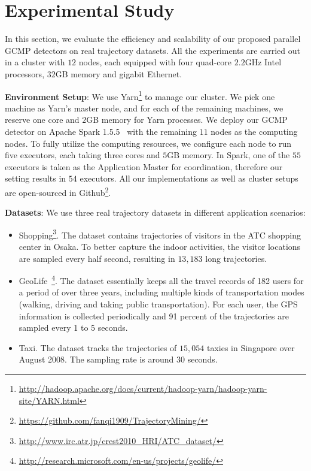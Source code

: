 \section{Experimental Study}
\label{sec:exp}
In this section, we evaluate the efficiency and scalability of our proposed parallel GCMP detectors on real trajectory datasets. All the experiments are carried out in a cluster with $12$ nodes, each equipped with four quad-core $2.2$GHz Intel processors, $32$GB memory and gigabit Ethernet. 

\textbf{Environment Setup}: We use Yarn\footnote{\url{http://hadoop.apache.org/docs/current/hadoop-yarn/hadoop-yarn-site/YARN.html}} to manage our cluster. We pick one machine as Yarn's master node, and for each of the remaining machines, we reserve one core and $2$GB memory for Yarn processes. We deploy our GCMP detector on Apache Spark 1.5.5~\cite{zaharia2012resilient} with the remaining $11$ nodes as the computing nodes.
To fully utilize the computing resources, we configure each node to run five executors, each taking three cores and $5$GB memory. In Spark, one of the $55$ executors is taken as the Application Master for coordination, therefore our setting results in $54$ executors.
All our implementations as well as cluster setups are open-sourced in Github\footnote{\url{https://github.com/fanqi1909/TrajectoryMining/}}.

\textbf{Datasets}: We use three real trajectory datasets in different application scenarios:
\begin{itemize}
\item{Shopping}\footnote{\url{http://www.irc.atr.jp/crest2010_HRI/ATC_dataset/}}. The dataset contains
  trajectories of visitors in the ATC shopping center in Osaka. To better capture the indoor activities, the visitor locations are sampled every half second, resulting in $13,183$ long trajectories. 
\item{GeoLife}~\footnote{\url{http://research.microsoft.com/en-us/projects/geolife/}}. The dataset essentially keeps all the travel records of 182 users for a period
of over three years, including multiple kinds of transportation modes (walking, driving and taking public
transportation). For each user, the GPS information is collected periodically and 91 percent of the trajectories
are sampled every 1 to 5 seconds.
\item{Taxi}. The dataset tracks the trajectories of $15,054$ taxies in Singapore over August 2008. The sampling
rate is around 30 seconds. 
\end{itemize}


